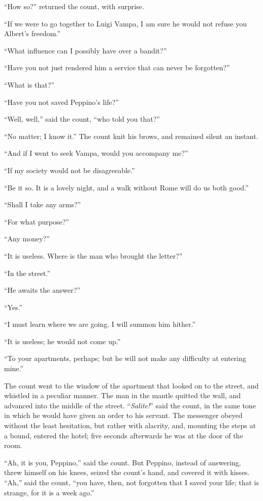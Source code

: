 “How so?” returned the count, with surprise.

“If we were to go together to Luigi Vampa, I am sure he would not
refuse you Albert’s freedom.”

“What influence can I possibly have over a bandit?”

“Have you not just rendered him a service that can never be forgotten?”

“What is that?”

“Have you not saved Peppino’s life?”

“Well, well,” said the count, “who told you that?”

“No matter; I know it.” The count knit his brows, and remained silent
an instant.

“And if I went to seek Vampa, would you accompany me?”

“If my society would not be disagreeable.”

“Be it so. It is a lovely night, and a walk without Rome will do us
both good.”

“Shall I take any arms?”

“For what purpose?”

“Any money?”

“It is useless. Where is the man who brought the letter?”

“In the street.”

“He awaits the answer?”

“Yes.”

“I must learn where we are going. I will summon him hither.”

“It is useless; he would not come up.”

“To your apartments, perhaps; but he will not make any difficulty at
entering mine.”

The count went to the window of the apartment that looked on to the
street, and whistled in a peculiar manner. The man in the mantle
quitted the wall, and advanced into the middle of the street.
“\textit{Salite!}” said the count, in the same tone in which he would have
given an order to his servant. The messenger obeyed without the least
hesitation, but rather with alacrity, and, mounting the steps at a
bound, entered the hotel; five seconds afterwards he was at the door of
the room.

“Ah, it is you, Peppino,” said the count. But Peppino, instead of
answering, threw himself on his knees, seized the count’s hand, and
covered it with kisses. “Ah,” said the count, “you have, then, not
forgotten that I saved your life; that is strange, for it is a week
ago.”

